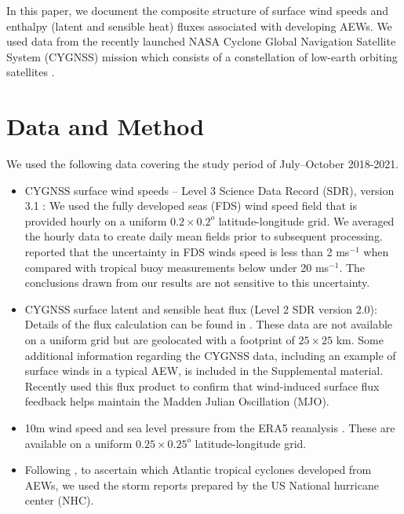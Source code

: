 \documentclass[draft]{agujournal2019}
\begin{document}
In this paper, we document the composite structure of surface wind speeds and enthalpy (latent and sensible heat) fluxes associated with developing AEWs. We used data from the recently launched NASA Cyclone Global Navigation Satellite System (CYGNSS) mission which consists of a constellation of low-earth orbiting satellites \cite{2016BAMS}. 

\section{Data and Method}

We used the following data covering the study period of July--October 2018-2021. 

\begin{itemize}
\item CYGNSS surface wind speeds -- Level 3 Science Data Record (SDR), version 3.1 \cite{2016BAMS}: We used the fully developed seas (FDS) wind speed field that is provided hourly on a uniform $0.2 \times 0.2^o$ latitude-longitude grid. We averaged the hourly data to create daily mean fields prior to subsequent processing.  reported that the uncertainty in FDS winds speed is less than  2 ms$^{-1}$ when compared with tropical buoy measurements below under 20 ms$^{-1}$. The conclusions drawn from our results are not sensitive to this uncertainty.

\item CYGNSS surface latent and sensible heat flux (Level 2 SDR version 2.0): Details of the flux calculation can be found in . These data are not available on a uniform grid but are geolocated with a footprint of  $25 \times 25$ km.  Some additional information regarding the CYGNSS data, including an example of surface winds in a typical AEW, is included in the Supplemental material. Recently  used this flux product to confirm that wind-induced surface flux feedback helps maintain the Madden Julian Oscillation (MJO). 

\item 10m wind speed and sea level pressure from the ERA5 reanalysis \cite{era5}. These are available on a uniform $0.2 5\times 0.25^o$ latitude-longitude grid. 

\item Following , to ascertain which Atlantic tropical cyclones developed from AEWs, we used the storm reports prepared by the US National hurricane center (NHC). 

\end{itemize}
\end{document}
